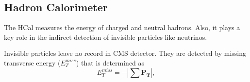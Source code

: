 
\subsection{Hadron Calorimeter}



The HCal measures the energy of charged and neutral hadrons. Also, it plays a key role in the indirect detection of invisible particles like neutrinos. 

Invisible particles leave no record in CMS detector. They are detected by missing transverse energy ($E_T^{miss}$) that is determined as 
\begin{equation}\label{eq:MET}
  E_T^{miss} = - | \sum \mathbf{P_T} |,
\end{equation}

